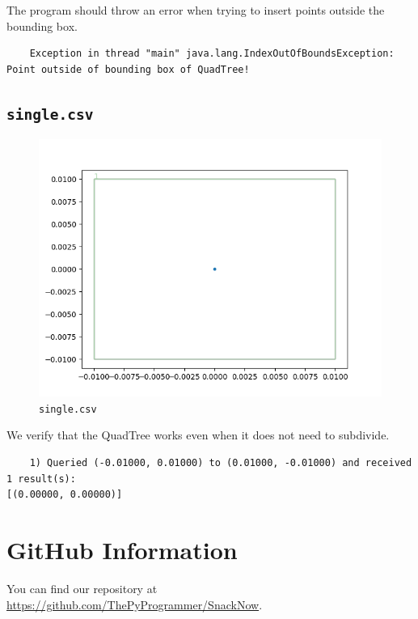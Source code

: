 \documentclass[12pt]{article}
\begin{document}
{The program should throw an error when trying to insert points outside the bounding box.

\begin{verbatim}
    Exception in thread "main" java.lang.IndexOutOfBoundsException: Point outside of bounding box of QuadTree!
\end{verbatim}

\subsection{\texttt{single.csv}}
\begin{figure}
    \centering
    \includegraphics[scale=0.8]{../img/single.png}
    \caption{\texttt{single.csv}}
    \label{fig:my_label}
\end{figure}

We verify that the QuadTree works even when it does not need to subdivide.

\begin{verbatim}
    1) Queried (-0.01000, 0.01000) to (0.01000, -0.01000) and received 1 result(s):
[(0.00000, 0.00000)]
\end{verbatim}



\newpage
\section{GitHub Information}
You can find our repository at \url{https://github.com/ThePyProgrammer/SnackNow}.

}
\end{document}

